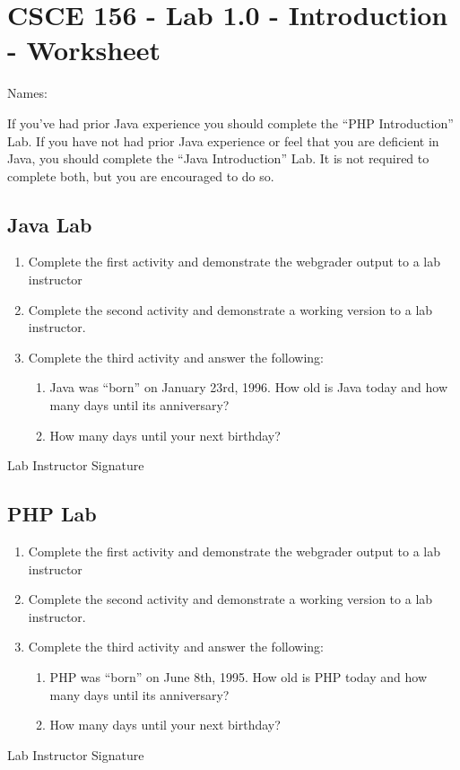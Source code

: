 \documentclass[12pt]{exam}
\begin{document}
\section*{CSCE 156 - Lab 1.0 - Introduction - Worksheet}

Names: \underline{\hspace{10cm}}

If you've had prior Java experience you should complete the 
``PHP Introduction'' Lab.  If you have not had prior Java 
experience or feel that you are deficient in Java, you should 
complete the ``Java Introduction'' Lab.  It is not required to 
complete both, but you are encouraged to do so.

\subsection*{Java Lab}

\begin{enumerate}
  \item Complete the first activity and demonstrate the webgrader output to a lab instructor
  \item Complete the second activity and demonstrate a working version to a lab instructor.  
  \item Complete the third activity and answer the following:
  \begin{enumerate} 
    \item Java was ``born'' on January 23rd, 1996.  
  How old is Java today and how many days until its anniversary?
    \item How many days until your next birthday?
  \end{enumerate}
\end{enumerate}
  
Lab Instructor Signature\underline{\hspace{7.5cm}}

\subsection*{PHP Lab}

\begin{enumerate}
  \item Complete the first activity and demonstrate the webgrader output to a lab instructor
  \item Complete the second activity and demonstrate a working version to a lab instructor.  
  \item Complete the third activity and answer the following:
  \begin{enumerate} 
    \item PHP was ``born'' on June 8th, 1995.  
  How old is PHP today and how many days until its anniversary?
    \item How many days until your next birthday?
  \end{enumerate}
\end{enumerate}

Lab Instructor Signature\underline{\hspace{7.5cm}}
\end{document}
